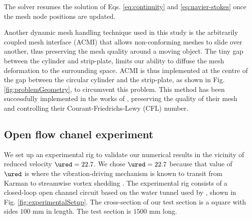 \documentclass[a4paper,fleqn]{cas-sc}
\begin{document}
\noindent The solver resumes the solution of Eqs. \ref{eq:continuity} and \ref{eq:navier-stokes} once the mesh node positions are updated.

Another dynamic mesh handling technique used in this study is the arbitrarily coupled mesh interface (ACMI) that allows non-conforming meshes to slide over another, thus preserving the mesh quality around a moving object. The tiny gap between the cylinder and strip-plate, limits our ability to diffuse the mesh deformation to the surrounding space. ACMI is thus implemented at the centre of the gap between the circular cylinder and the strip-plate, as shown in Fig. \ref{fig:problemGeometry}, to circumvent this problem. This method has been successfully implemented in the works of \citet{Ding2015b,Zhang2018}, preserving the quality of their mesh and controlling their Courant-Friedrichs-Lewy (CFL) number.

\subsection{Open flow chanel experiment} \label{ssec:openFlowExp}

We set up an experimental rig to validate our numerical results in the vicinity of reduced velocity $\ured = 22.7$. We chose $\ured = 22.7$ because that value of $\ured$ is where the vibration-driving mechanism is known to transit from Karman to streamwise vortex shedding \citep{Koide2013}. The experimental rig consists of a closed-loop open channel circuit based on the water tunnel used by \citet{Nguyen2012}, shown in Fig. \ref{fig:experimentalSetup}. The cross-section of our test section is a square with sides $100$ mm in length. The test section is $1500$ mm long.
\end{document}
